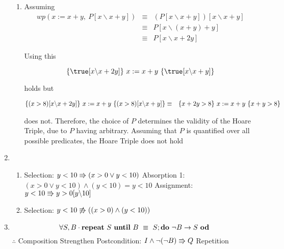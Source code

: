 \documentclass{article}
\begin{document}
\begin{enumerate}
\begin{enumerate}
    \item Assuming
        \begin{eqnarray*}
            wp(x := x + y,\ P[x \backslash x + y]) & \equiv & (P[x \backslash x + y])[x \backslash x + y]\\
                & \equiv & P[x \backslash (x + y) + y]\\
                & \equiv & P[x \backslash x + 2y]
        \end{eqnarray*}

        Using this

        \[ \hoare{\true[x \backslash x + 2y]}{x := x + y}{\true[x \backslash x + y]} \]

        holds but

        \begin{eqnarray*}
            \{{(x > 8)[x \backslash x + 2y]}\}\ {x := x + y}\ \{{(x > 8)[x \backslash x + y]}\} & \equiv & \{{x + 2y > 8}\}\ {x := x + y}\ \{{x + y > 8}\}
        \end{eqnarray*}

        does not. Therefore, the choice of $P$ determines the validity of the Hoare Triple, due to $P$ having arbitrary.
        Assuming that $P$ is quantified over all possible predicates, the Hoare Triple does not hold

    \end{enumerate}
\item
    \begin{enumerate}
    \item 
        \DERIVE
         {Selection: $y < 10 \Rrightarrow (x > 0 \lor y < 10)$}
         {Absorption 1: $(x > 0 \lor y < 10) \land (y < 10) = y < 10$}
         {Assignment: $y < 10 \Rrightarrow y > 0[y \backslash 10]$}
        \ENDDERIVE

    \item 
        \DERIVE
        \hint{\doesntrefsto} {Selection: $y < 10 \not\Rrightarrow ((x > 0) \land (y < 10))$}

        \ENDDERIVE
    \end{enumerate}
\item

    \[\forall S, B \cdot \Repeat\ S\ \Until\ B ~\equiv~ S; \Do\ \neg B \rightarrow S\ \Od\]
    $\therefore$
    \DERIVE
     {Composition}
     {Strengthen Postcondition: $I \land \neg(\neg B) \Rrightarrow Q$}
     {Repetition}
 \ENDDERIVE


\end{enumerate}
\end{document}

